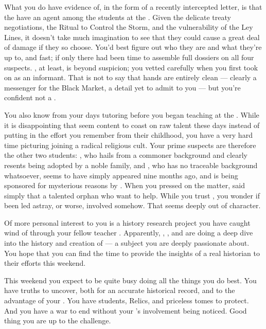 \documentclass[char]{GL2020}
\begin{document}
What you do have evidence of, in the form of a recently intercepted letter, is that the \pGoaties{} have an agent among the \pFarm{} students at the \pSchool{}. Given the delicate treaty negotiations, the Ritual to Control the Storm, and the vulnerability of the Ley Lines, it doesn't take much imagination to see that they could cause a great deal of damage if they so choose. You'd best figure out who they are and what they're up to, and fast; if only there had been time to assemble full dossiers on all four suspects. \cLibAssist{}, at least, is beyond suspicion; you vetted \cLibAssist{\them} carefully when you first took \cLibAssist{\them} on as an informant. That is not to say that \cLibAssist{\their} hands are entirely clean — \cLibAssist{\theyare} clearly a messenger for the Black Market, a detail \cLibAssist{\they} \cLibAssist{\have} yet to admit to you — but you're confident \cLibAssist{\theyare} not a \pGoatie{}. 

You also know \cChupStudent{\full} from your days tutoring \cChupStudent{\them} before you began teaching at the \pSchool{}. While it is disappointing that \cChupStudent{\they} seem\cChupStudent{\verbs} content to coast on \cChupStudent{\their} raw talent these days instead of putting in the effort you remember from their childhood, you have a very hard time picturing \cChupStudent{\them} joining a radical religious cult. Your prime suspects are therefore the other two \pFarm{} students: \cAdopted{\full}, who hails from a commoner background and clearly resents being adopted by a noble family, and \cDisney{\full}, who has no traceable background whatsoever, seems to have simply appeared nine months ago, and is being sponsored for mysterious reasons by \cWildCard{}. When you pressed \cWildCard{} on the matter, \cWildCard{\they} said simply that \cDisney{\they \were} a talented orphan who \cWildCard{\they} want to help. While you trust \cWildCard{}, you wonder if \cWildCard{\they \have} been led astray, or worse, involved somehow. That seems deeply out of character.  

Of more personal interest to you is a history research project you have caught wind of through your fellow teacher \cBeetle{\full}. Apparently, \cEbbPriest{\full}, \cHeadScientist{\full}, and \cScholarship{\full} are doing a deep dive into the history and creation of \pEarth{}— a subject you are deeply passionate about. You hope that you can find the time to provide the insights of a real historian to their efforts this weekend.

This weekend you expect to be quite busy doing all the things you do best. You have truths to uncover, both for an accurate historical record, and to the advantage of your \cQueen{\Monarch}. You have students, Relics, and priceless tomes to protect. And you have a war to end without your \cQueen{\Monarch}’s involvement being noticed. Good thing you are up to the challenge.
\end{document}
